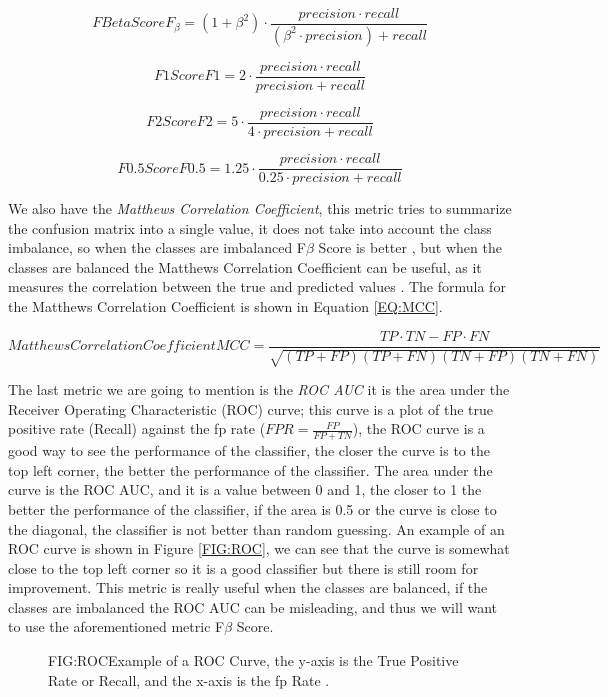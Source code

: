 \begin{equation}[EQ:FBETA]{F Beta Score}
    \boxed{F_{\beta} = (1+\beta^2)\cdot\frac{precision \cdot recall}{(\beta^2\cdot precision)+recall}}
\end{equation}

\begin{equation}[EQ:F1SCORE]{F1 Score}
    F1 = 2 \cdot \frac{precision \cdot recall}{precision + recall}
\end{equation}

\begin{equation}[EQ:F2SCORE]{F2 Score}
    F2 = 5 \cdot \frac{precision \cdot recall}{4 \cdot precision + recall}
\end{equation}

\begin{equation}[EQ:F0.5SCORE]{F0.5 Score}
    F0.5 = 1.25 \cdot \frac{precision \cdot recall}{0.25 \cdot precision + recall}
\end{equation}

We also have the \textit{Matthews Correlation Coefficient}, this metric tries to summarize the confusion matrix into a single value, it 
does not take into account the class imbalance, so when the classes are imbalanced F$\beta$ Score is better \cite{sisters_matthews_2020}, but when the classes are balanced the Matthews Correlation Coefficient can be useful, as it measures the correlation between the true and predicted values \cite{shmueli_matthews_2020}. The formula for the Matthews Correlation Coefficient is shown in Equation \ref{EQ:MCC}.

\begin{equation}[EQ:MCC]{Matthews Correlation Coefficient}
    \boxed{MCC = \frac{TP \cdot TN - FP \cdot FN}{\sqrt{(TP + FP)(TP + FN)(TN + FP)(TN + FN)}}}
\end{equation}

The last metric we are going to mention is the \textit{ROC AUC} it is the area under %
the Receiver Operating Characteristic (ROC) curve; this curve is a plot of the true positive rate (Recall) against the \acl{fp} rate ($FPR = \frac{FP}{FP + TN}$), the ROC curve is a good way to see the performance of the classifier, the closer the curve is to the top left corner, the better the performance of the classifier. The area under the curve is the ROC AUC, and it is a value between 0 and 1, the closer to 1 the better the performance of the classifier, if the area is 0.5 or the curve is close to the diagonal, the classifier is not better than random guessing. An example of an ROC curve is shown in Figure \ref{FIG:ROC}, we can see that the curve is somewhat close to the top left corner so it is a good classifier but there is still room for improvement. This metric is really useful when the classes are balanced, if the classes are imbalanced the ROC AUC can be misleading, and thus we will want to use the aforementioned metric F$\beta$ Score.

\begin{figure}[ROC Curve Example \cite{chazhoor_roc_2019}.]{FIG:ROC}{Example of a ROC Curve, the y-axis is the True Positive Rate or Recall, and the x-axis is the \ac{fp} Rate \cite{chazhoor_roc_2019}.}
\end{figure}

